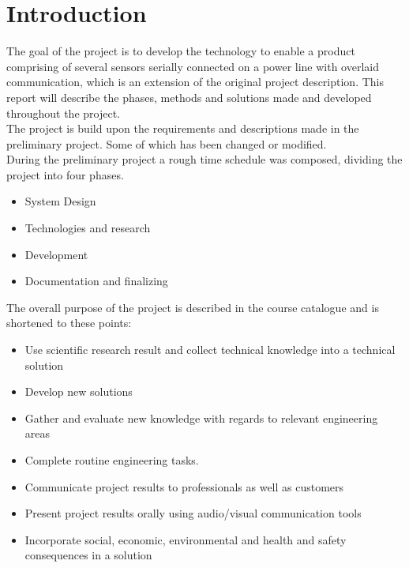 \chapter{Introduction}

The goal of the project is to develop the technology to enable a product comprising of several sensors serially connected on a power line with overlaid communication, which is an extension of the original project description. This report will describe the phases, methods and solutions made and developed throughout the project.\\

The project is build upon the requirements and descriptions made in the preliminary project. Some of which has been changed or modified.\\

During the preliminary project a rough time schedule was composed, dividing the project into four phases.

\begin{itemize}
	\item System Design
	\item Technologies and research
	\item Development
	\item Documentation and finalizing
\end{itemize}

The overall purpose of the project is described in the course catalogue and is shortened to these points:

\begin{itemize}
	\item Use scientific research result and collect technical knowledge into a technical solution
	\item Develop new solutions
	\item Gather and evaluate new knowledge with regards to relevant engineering areas
	\item Complete routine engineering tasks.
	\item Communicate project results to professionals as well as customers
	\item Present project results orally using audio/visual communication tools
	\item Incorporate social, economic, environmental and health and safety consequences in a solution	
\end{itemize}

